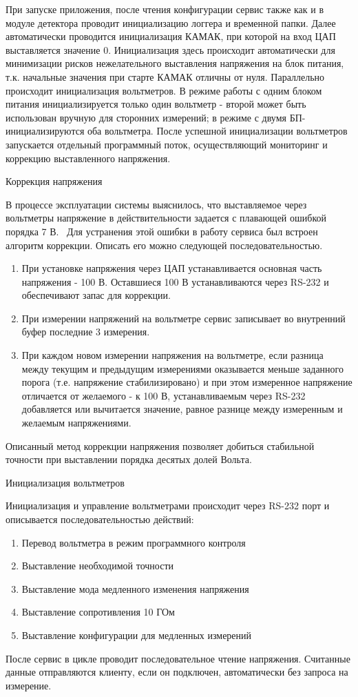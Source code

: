 \documentclass{article}
\begin{document}
При запуске приложения, после чтения конфигурации сервис также как и в модуле детектора проводит инициализацию логгера и временной папки. Далее автоматически проводится инициализация КАМАК, при которой на вход ЦАП выставляется значение 0. Инициализация здесь происходит автоматически для минимизации рисков нежелательного выставления напряжения на блок питания, т.к. начальные значения при старте КАМАК отличны от нуля. Параллельно происходит инициализация вольтметров. В режиме работы с одним блоком питания инициализируется только один вольтметр - второй может быть использован вручную для сторонних измерений; в режиме с двумя БП- инициализируются оба вольтметра. После успешной инициализации вольтметров запускается отдельный программный поток, осуществляющий мониторинг и коррекцию выставленного напряжения.

Коррекция напряжения

В процессе эксплуатации системы выяснилось, что выставляемое через вольтметры напряжение в действительности задается с плавающей ошибкой порядка 7 В. \ Для устранения этой ошибки в работу сервиса был встроен алгоритм коррекции. Описать его можно следующей последовательностью.

\begin{enumerate}
\item При установке напряжения через ЦАП устанавливается основная часть напряжения - 100 В. Оставшиеся 100 В устанавливаются через RS-232 и обеспечивают запас для коррекции. 
\item При измерении напряжений на вольтметре сервис записывает во внутренний буфер последние 3 измерения. 
\item При каждом новом измерении напряжения на вольтметре, если разница между текущим и предыдущим измерениями оказывается меньше заданного порога (т.е. напряжение стабилизировано) и при этом измеренное напряжение отличается от желаемого - к 100 В, устанавливаемым через RS-232 добавляется или вычитается значение, равное разнице между измеренным и желаемым напряжениями.
\end{enumerate}
Описанный метод коррекции напряжения позволяет добиться стабильной точности при выставлении порядка десятых долей Вольта.

Инициализация вольтметров

Инициализация и управление вольтметрами происходит через RS-232 порт и описывается последовательностью действий:

\begin{enumerate}
\item Перевод вольтметра в режим программного контроля
\item Выставление необходимой точности
\item Выставление мода медленного изменения напряжения
\item Выставление сопротивления 10 ГОм
\item Выставление конфигурации для медленных измерений
\end{enumerate}
После сервис в цикле проводит последовательное чтение напряжения. Считанные данные отправляются клиенту, если он подключен, автоматически без запроса на измерение.
\end{document}
